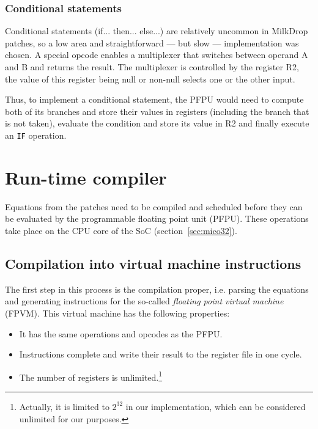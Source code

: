 \documentclass[a4paper,11pt]{kthesis}
\begin{document}
\subsubsection{Conditional statements}
Conditional statements (if... then... else...) are relatively uncommon in MilkDrop patches, so a low area and straightforward --- but slow --- implementation was chosen. A special opcode enables a multiplexer that switches between operand A and B and returns the result. The multiplexer is controlled by the register R2, the value of this register being null or non-null selects one or the other input.

Thus, to implement a conditional statement, the PFPU would need to compute both of its branches and store their values in registers (including the branch that is not taken), evaluate the condition and store its value in R2 and finally execute an \verb!IF! operation.

\section{Run-time compiler}
Equations from the patches need to be compiled and scheduled before they can be evaluated by the programmable floating point unit (PFPU). These operations take place on the CPU core of the SoC (section~\ref{sec:mico32}).

\subsection{Compilation into virtual machine instructions}
\label{subsec:fpvm}
The first step in this process is the compilation proper, i.e. parsing the equations and generating instructions for the so-called \textit{floating point virtual machine} (FPVM). This virtual machine has the following properties:
\begin{itemize}
\item It has the same operations and opcodes as the PFPU.
\item Instructions complete and write their result to the register file in one cycle.
\item The number of registers is unlimited.\footnote{Actually, it is limited to $2^{32}$ in our implementation, which can be considered unlimited for our purposes.}
\end{itemize}
\end{document}
